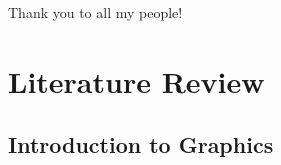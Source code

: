 \documentclass[print]{nuthesis}
\begin{document}
\begin{acknowledgments}
Thank you to all my people!
\end{acknowledgments}


\tableofcontents

\listoffigures
\listoftables

\mainmatter


\hypertarget{literature-review}{%
\chapter{Literature Review}\label{literature-review}}

\hypertarget{introduction-to-graphics}{%
\section{Introduction to Graphics}\label{introduction-to-graphics}}
\end{document}
